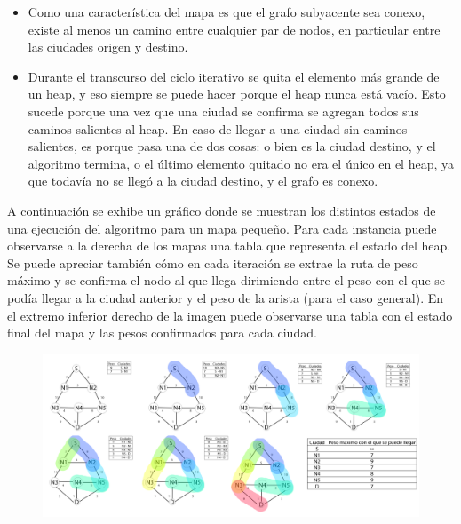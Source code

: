 \begin{itemize}
	\item Como una característica del mapa es que el grafo subyacente sea
conexo, existe al menos un camino entre cualquier par de nodos, en particular entre las ciudades origen y destino.
	\item Durante el transcurso del ciclo iterativo se quita el elemento
más grande de un heap, y eso siempre se puede hacer porque el heap nunca está
vacío. Esto sucede porque una vez que una ciudad se confirma se agregan todos
sus caminos salientes al heap. En caso de llegar a una ciudad sin caminos
salientes, es porque pasa una de dos cosas: o bien es la ciudad destino, y el
algoritmo termina, o el último elemento quitado no era el único en el heap, ya
que todavía no se llegó a la ciudad destino, y el grafo es conexo.
\end{itemize}

\indent A continuación se exhibe un gráfico donde se muestran los distintos estados de una ejecución del algoritmo para un mapa pequeño. Para cada instancia puede observarse a la derecha de los mapas una tabla que representa el estado del heap. Se puede apreciar también cómo en cada iteración se extrae la ruta de peso máximo y se confirma el nodo al que llega dirimiendo entre el peso con el que se podía llegar a la ciudad anterior y el peso de la arista (para el caso general). En el extremo inferior derecho de la imagen puede observarse una tabla con el estado final del mapa y las pesos confirmados para cada ciudad.

\begin{figure}[h]
	\centering
	\includegraphics[width=450px]{./figs/algoritmoEj1.png}
\end{figure}

